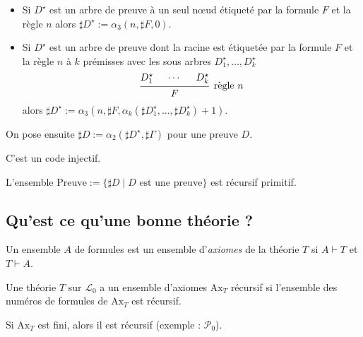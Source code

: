 \documentclass[./main]{subfiles}
\begin{document}
 \begin{defn}
   \begin{itemize}
     \item Si $D^\star$ est un arbre de preuve à un seul nœud étiqueté par la formule  $F$ et la règle $n$ alors $\sharp D^\star := \alpha_3(n, \sharp F, 0)$.
     \item Si $D^\star$ est un arbre de preuve dont la racine est étiquetée par la formule  $F$ et la règle $n$ à $k$ prémisses avec les sous arbres $D_1^\star, \ldots, D_k^\star$ 
       \[
       \begin{prooftree}
         \hypo{D_1^\star} \hypo{\cdots} \hypo{D_k^\star}
         \infer 3[\text{règle $n$}]{F}
       \end{prooftree}
       \]
       alors $\sharp D^\star := \alpha_3(n, \sharp F, \alpha_k(\sharp D_1^\star, \ldots, \sharp D_k^\star) + 1)$.
   \end{itemize}

   On pose ensuite $\sharp D := \alpha_2(\sharp D^\star, \sharp \Gamma)$ pour une preuve $D$.
 \end{defn}

 \begin{lem}
   C'est un code injectif.
 \end{lem}
 \begin{lem}
   L'ensemble $\mathrm{Preuve} := \{\sharp D  \mid D \text{ est une preuve}\}$ est récursif primitif.
 \end{lem}

 \subsection{Qu'est ce qu'une bonne théorie ?}

 \begin{defn}
   Un ensemble $A$ de formules est un ensemble d'\textit{axiomes} de la théorie $T$ si $A \vdash T$ et $T \vdash A$.
 \end{defn}

 \begin{defn}
   Une théorie $T$ sur $\mathcal{L}_0$ a un ensemble d'axiomes $\mathrm{Ax}_T$ récursif si l'ensemble des numéros de formules de $\mathrm{Ax}_T$ est récursif.
 \end{defn}
 \begin{rmk}
   Si $\mathrm{Ax}_T$ est fini, alors il est récursif (exemple : $\mathcal{P}_0$).
 \end{rmk}
\end{document}
